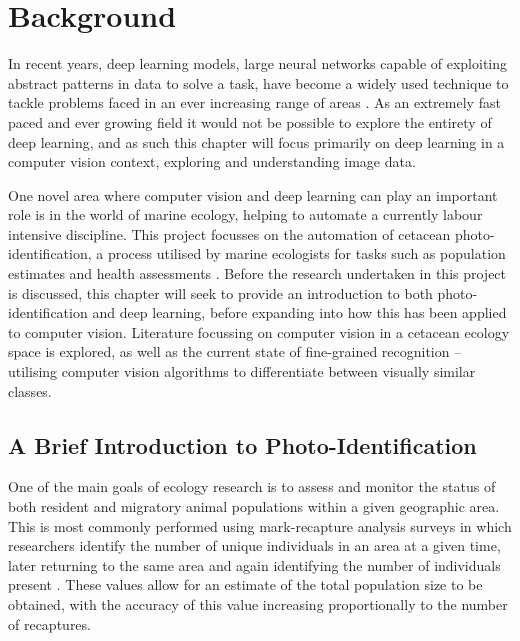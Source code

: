 \chapter{Background}\label{ch:Background}

In recent years, deep learning models, large neural networks capable of exploiting abstract patterns in data to solve a task, have become a widely used technique to tackle problems faced in an ever increasing range of areas \cite{lecun_deep_2015, zhang_machine_2017, korotcov_comparison_2017, paterakis_deep_2017}. As an extremely fast paced and ever growing field it would not be possible to explore the entirety of deep learning, and as such this chapter will focus primarily on deep learning in a computer vision context, exploring and understanding image data. 

One novel area where computer vision and deep learning can play an important role is in the world of marine ecology, helping to automate a currently labour intensive discipline. This project focusses on the automation of cetacean photo-identification, a process utilised by marine ecologists for tasks such as population estimates and health assessments \cite{holmberg_estimating_2009, cheney_long-term_2014, lockyer_observations_1990, van_bressem_visual_2018}. Before the research undertaken in this project is discussed, this chapter will seek to provide an introduction to both photo-identification and deep learning, before expanding into how this has been applied to computer vision. Literature focussing on computer vision in a cetacean ecology space is explored, as well as the current state of fine-grained recognition -- utilising computer vision algorithms to differentiate between visually similar classes.

\section{A Brief Introduction to Photo-Identification}\label{ch:Background,sec:photo-id}

One of the main goals of ecology research is to assess and monitor the status of both resident and migratory animal populations within a given geographic area. This is most commonly performed using mark-recapture analysis surveys in which researchers identify the number of unique individuals in an area at a given time, later returning to the same area and again identifying the number of individuals present \cite{constantine_abundance_2012, bigg_assessment_1982, sharpe_indian_2019, cheney_long-term_2014, arso_civil_changing_2019, tyson_moore_final_2020}. These values allow for an estimate of the total population size to be obtained, with the accuracy of this value increasing proportionally to the number of recaptures.

